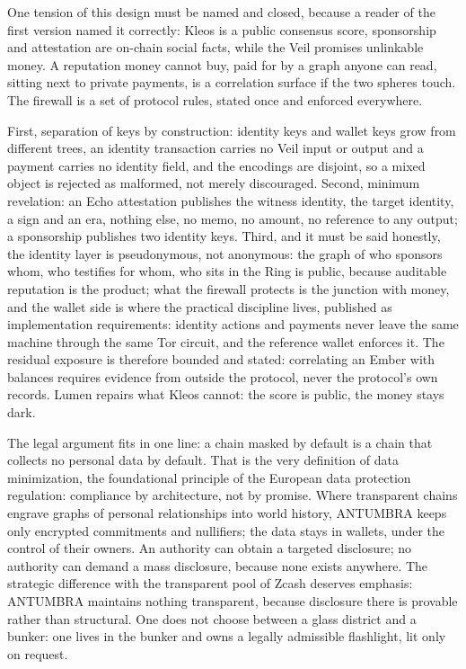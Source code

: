 One tension of this design must be named and closed, because a reader of
the first version named it correctly: Kleos is a public consensus score,
sponsorship and attestation are on-chain social facts, while the Veil
promises unlinkable money. A reputation money cannot buy, paid for by a
graph anyone can read, sitting next to private payments, is a correlation
surface if the two spheres touch. The firewall is a set of protocol
rules, stated once and enforced everywhere.

First, separation of keys by construction: identity keys and wallet keys
grow from different trees, an identity transaction carries no Veil input
or output and a payment carries no identity field, and the encodings are
disjoint, so a mixed object is rejected as malformed, not merely
discouraged. Second, minimum revelation: an Echo attestation publishes
the witness identity, the target identity, a sign and an era, nothing
else, no memo, no amount, no reference to any output; a sponsorship
publishes two identity keys. Third, and it must be said honestly, the
identity layer is pseudonymous, not anonymous: the graph of who sponsors
whom, who testifies for whom, who sits in the Ring is public, because
auditable reputation is the product; what the firewall protects is the
junction with money, and the wallet side is where the practical
discipline lives, published as implementation requirements: identity
actions and payments never leave the same machine through the same Tor
circuit, and the reference wallet enforces it. The residual exposure is
therefore bounded and stated: correlating an Ember with balances requires
evidence from outside the protocol, never the protocol's own records.
Lumen repairs what Kleos cannot: the score is public, the money stays
dark.

The legal argument fits in one line: a chain masked by default is a chain
that collects no personal data by default. That is the very definition of
data minimization, the foundational principle of the European data
protection regulation: compliance by architecture, not by promise. Where
transparent chains engrave graphs of personal relationships into world
history, ANTUMBRA keeps only encrypted commitments and nullifiers; the
data stays in wallets, under the control of their owners. An authority
can obtain a targeted disclosure; no authority can demand a mass
disclosure, because none exists anywhere. The strategic difference with
the transparent pool of Zcash deserves emphasis: ANTUMBRA maintains
nothing transparent, because disclosure there is provable rather than
structural. One does not choose between a glass district and a bunker:
one lives in the bunker and owns a legally admissible flashlight, lit
only on request.
